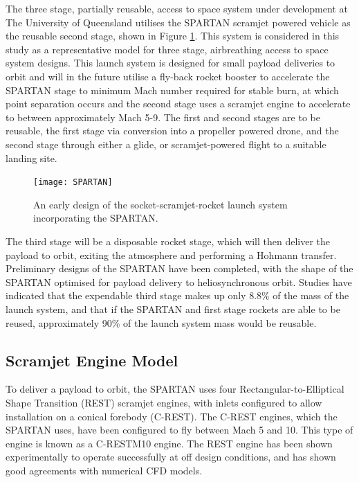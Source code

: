 The three stage, partially reusable, access to space system under development at The University of Queensland utilises the SPARTAN\cite{Jazra2013} scramjet powered vehicle as the reusable second stage, shown in Figure \ref{fig:SPARTAN}. This system is considered in this study as a representative model for three stage, airbreathing access to space system designs. This launch system is designed for small payload deliveries to orbit and will in the future utilise a fly-back rocket booster to accelerate the SPARTAN stage to minimum Mach number required for stable burn, at which point separation occurs and the second stage uses a scramjet engine to accelerate to between approximately Mach 5-9. The first and second stages are to be reusable, the first stage via conversion into a propeller powered drone, and the second stage through either a glide, or scramjet-powered flight to a suitable landing site.
\begin{figure}[ht]
	\centering
	\texttt{[image: SPARTAN]}
	\caption{An early design of the socket-scramjet-rocket launch system incorporating the SPARTAN\cite{Jazra2013}.}
	\label{fig:SPARTAN}
\end{figure}
The third stage will be a disposable rocket stage, which will then deliver the payload to orbit, exiting the atmosphere and performing a Hohmann transfer. 
Preliminary designs of the SPARTAN have been completed, with the shape of the SPARTAN optimised for payload delivery to heliosynchronous orbit.
Studies have indicated that the expendable third stage makes up only 8.8\% of the mass of the launch system, and that if the SPARTAN and first stage rockets are able to be reused, approximately 90\% of the launch system mass would be reusable\cite{Preller2017b}.

\subsection{Scramjet Engine Model}\label{sec:enginemodel}

To deliver a payload to orbit, the SPARTAN uses four Rectangular-to-Elliptical Shape Transition (REST) scramjet engines, with inlets configured to allow installation on a conical forebody (C-REST). The C-REST engines, which the SPARTAN uses, have been configured to fly between Mach 5 and 10. This type of engine is known as a C-RESTM10 engine\cite{Preller2017b}. The REST engine has been shown experimentally to operate successfully at off design conditions\cite{Smart2006,Smart2009a}, and has shown good agreements with numerical CFD models\cite{Smart2009a}. 

